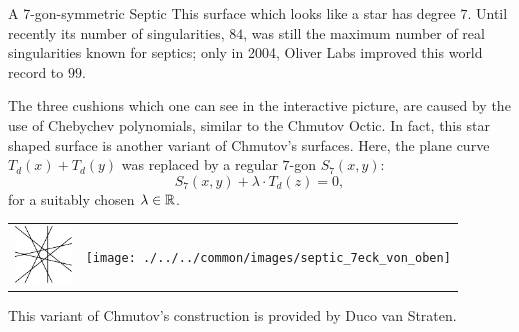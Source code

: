 \begin{surferPage}[7-gon]{A 7-gon-symmetric Septic}
    This surface which looks like a star has degree $7$.  
    Until recently its number of singularities, $84$, was still the
    maximum number of real singularities known for septics;
    only in 2004, Oliver Labs improved this world record to $99$.
  
  
 The three cushions which one can see in the interactive picture, 
    are caused by the use of Chebychev polynomials, similar to the Chmutov
    Octic. 
    In fact, this star shaped surface is another variant of Chmutov's surfaces.
    Here, the plane curve $T_d(x)+T_d(y)$ was replaced by a regular $7$-gon
    $S_7(x,y)$: 
   \[S_7(x,y) + \lambda \cdot T_d(z) = 0,\]
    for a suitably chosen $\lambda\in{\mathbb R}$. 
    \vspace*{-0.3em}
    \begin{center}
      \begin{tabular}{c@{\qquad}c}
        \includegraphics[height=1.5cm]{./../../common/images/labsseptic1.pdf}
        &
        \texttt{[image: ./../../common/images/septic\_7eck\_von\_oben]}
      \end{tabular}
    \end{center}
    \vspace*{-0.3em}   
   This variant of Chmutov's construction is provided by Duco van Straten.
\end{surferPage}
